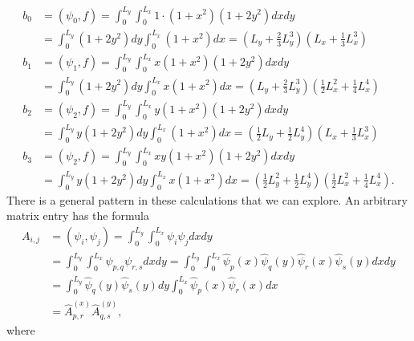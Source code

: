 \documentclass[../main.tex]{subfiles}
\begin{document}
	$$
	\begin{aligned}
		b_{0} &=\left(\psi_{0}, f\right)=\int_{0}^{L_{y}} \int_{0}^{L_{x}} 1 \cdot\left(1+x^{2}\right)\left(1+2 y^{2}\right) d x d y \\
		&=\int_{0}^{L_{y}}\left(1+2 y^{2}\right) d y \int_{0}^{L_{x}}\left(1+x^{2}\right) d x=\left(L_{y}+\frac{2}{3} L_{y}^{3}\right)\left(L_{x}+\frac{1}{3} L_{x}^{3}\right) \\
		b_{1} &=\left(\psi_{1}, f\right)=\int_{0}^{L_{y}} \int_{0}^{L_{x}} x\left(1+x^{2}\right)\left(1+2 y^{2}\right) d x d y \\
		&=\int_{0}^{L_{y}}\left(1+2 y^{2}\right) d y \int_{0}^{L_{x}} x\left(1+x^{2}\right) d x=\left(L_{y}+\frac{2}{3} L_{y}^{3}\right)\left(\frac{1}{2} L_{x}^{2}+\frac{1}{4} L_{x}^{4}\right) \\
		b_{2} &=\left(\psi_{2}, f\right)=\int_{0}^{L_{y}} \int_{0}^{L_{x}} y\left(1+x^{2}\right)\left(1+2 y^{2}\right) d x d y \\
		&=\int_{0}^{L_{y}} y\left(1+2 y^{2}\right) d y \int_{0}^{L_{x}}\left(1+x^{2}\right) d x=\left(\frac{1}{2} L_{y}+\frac{1}{2} L_{y}^{4}\right)\left(L_{x}+\frac{1}{3} L_{x}^{3}\right) \\
		b_{3} &=\left(\psi_{2}, f\right)=\int_{0}^{L_{y}} \int_{0}^{L_{x}} x y\left(1+x^{2}\right)\left(1+2 y^{2}\right) d x d y \\
		&=\int_{0}^{L_{y}} y\left(1+2 y^{2}\right) d y \int_{0}^{L_{x}} x\left(1+x^{2}\right) d x=\left(\frac{1}{2} L_{y}^{2}+\frac{1}{2} L_{y}^{4}\right)\left(\frac{1}{2} L_{x}^{2}+\frac{1}{4} L_{x}^{4}\right).
	\end{aligned}
	$$
	There is a general pattern in these calculations that we can explore. An arbitrary matrix entry has the formula
	$$
	\begin{aligned}
		A_{i, j} &=\left(\psi_{i}, \psi_{j}\right)=\int_{0}^{L_{y}} \int_{0}^{L_{x}} \psi_{i} \psi_{j} d x d y \\
		&=\int_{0}^{L_{y}} \int_{0}^{L_{x}} \psi_{p, q} \psi_{r, s} d x d y=\int_{0}^{L_{y}} \int_{0}^{L_{x}} \hat{\psi}_{p}(x) \hat{\psi}_{q}(y) \hat{\psi}_{r}(x) \hat{\psi}_{s}(y) d x d y \\
		&=\int_{0}^{L_{y}} \hat{\psi}_{q}(y) \hat{\psi}_{s}(y) d y \int_{0}^{L_{x}} \hat{\psi}_{p}(x) \hat{\psi}_{r}(x) d x \\
		&=\hat{A}_{p, r}^{(x)} \hat{A}_{q, s}^{(y)},
	\end{aligned}
	$$
	where
	
\end{document}
